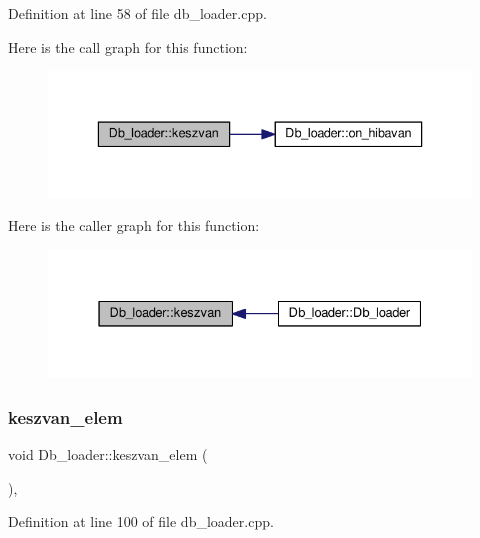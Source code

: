 Definition at line 58 of file db\+\_\+loader.\+cpp.

Here is the call graph for this function\+:\nopagebreak
\begin{figure}[H]
\begin{center}
\leavevmode
\includegraphics[width=336pt]{classDb__loader_a3d308bb09c20a83faa4da10aae8bca27_cgraph}
\end{center}
\end{figure}
Here is the caller graph for this function\+:\nopagebreak
\begin{figure}[H]
\begin{center}
\leavevmode
\includegraphics[width=331pt]{classDb__loader_a3d308bb09c20a83faa4da10aae8bca27_icgraph}
\end{center}
\end{figure}
\mbox{\label{classDb__loader_a089a424b1719bfbf4068b10bd1070614}} 
\subsubsection{\texorpdfstring{keszvan\+\_\+elem}{keszvan\_elem}}
{\footnotesize\ttfamily void Db\+\_\+loader\+::keszvan\+\_\+elem (\begin{DoxyParamCaption}{ }\end{DoxyParamCaption})\hspace{0.3cm}{\ttfamily [private]}, {\ttfamily [slot]}}



Definition at line 100 of file db\+\_\+loader.\+cpp.

